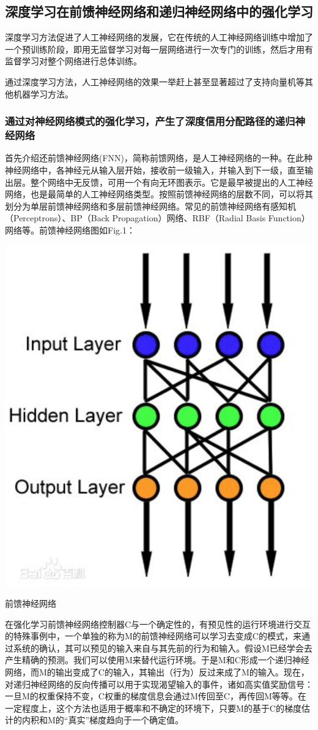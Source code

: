 \documentclass[10pt,journal,compsoc]{IEEEtran}
\begin{document}
\subsection{深度学习在前馈神经网络和递归神经网络中的强化学习}
深度学习方法促进了人工神经网络的发展，它在传统的人工神经网络训练中增加了一个预训练阶段，即用无监督学习对每一层网络进行一次专门的训练，然后才用有监督学习对整个网络进行总体训练。\par
通过深度学习方法，人工神经网络的效果一举赶上甚至显著超过了支持向量机等其他机器学习方法。
\subsubsection{通过对神经网络模式的强化学习，产生了深度信用分配路径的递归神经网络}
首先介绍还前馈神经网络(FNN)，简称前馈网络，是人工神经网络的一种。在此种神经网络中，各神经元从输入层开始，接收前一级输入，并输入到下一级，直至输出层。整个网络中无反馈，可用一个有向无环图表示。它是最早被提出的人工神经网络，也是最简单的人工神经网络类型。按照前馈神经网络的层数不同，可以将其划分为单层前馈神经网络和多层前馈神经网络。常见的前馈神经网络有感知机（Perceptrons）、BP（Back Propagation）网络、RBF（Radial Basis Function）网络等。前馈神经网络图如Fig.1：\par

\makeatletter
\def\@captype{figure}
\makeatother

\includegraphics[width = .4\textwidth]{feedback.png}
\caption{前馈神经网络}
在强化学习前馈神经网络控制器C与一个确定性的，有预见性的运行环境进行交互的特殊事例中，一个单独的称为M的前馈神经网络可以学习去变成C的模式，来通过系统的确认，其可以预见的输入来自与其先前的行为和输入。假设M已经学会去产生精确的预测。我们可以使用M来替代运行环境。于是M和C形成一个递归神经网络，而M的输出变成了C的输入，其输出（行为）反过来成了M的输入。现在，对递归神经网络的反向传播可以用于实现渴望输入的事件，诸如高实值奖励信号：一旦M的权重保持不变，C权重的梯度信息会通过M传回至C，再传回M等等。在一定程度上，这个方法也适用于概率和不确定的环境下，只要M的基于C的梯度估计的内积和M的“真实”梯度趋向于一个确定值。
\end{document}
